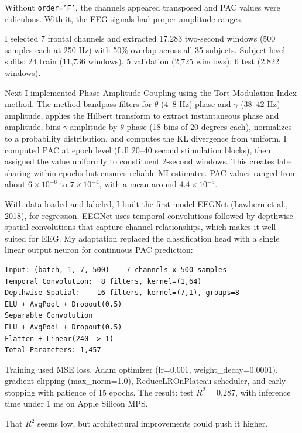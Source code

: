 \documentclass[11pt,letterpaper]{article}
\begin{document}
Without \texttt{order='F'}, the channels appeared transposed and PAC values were ridiculous.
With it, the EEG signals had proper amplitude ranges.

I selected 7 frontal channels and extracted 17,283 two-second windows (500 samples each at
250 Hz) with 50\% overlap across all 35 subjects. Subject-level splits: 24 train (11,736
windows), 5 validation (2,725 windows), 6 test (2,822 windows).

Next I implemented Phase-Amplitude Coupling using the Tort Modulation Index method. The method
bandpass filters for $\theta$ (4--8 Hz) phase and $\gamma$ (38--42 Hz) amplitude, applies the
Hilbert transform to extract instantaneous phase and amplitude, bins $\gamma$ amplitude by
$\theta$ phase (18 bins of 20 degrees each), normalizes to a probability distribution, and
computes the KL divergence from uniform. I computed PAC at epoch level (full 20--40 second
stimulation blocks), then assigned the value uniformly to constituent 2-second windows. This
creates label sharing within epochs but ensures reliable MI estimates. PAC values ranged from
about $6 \times 10^{-6}$ to $7 \times 10^{-4}$, with a mean around $4.4 \times 10^{-5}$.

With data loaded and labeled, I built the first model EEGNet (Lawhern et al., 2018), for
regression. EEGNet uses temporal convolutions followed by depthwise spatial convolutions that
capture channel relationships, which makes it well-suited for EEG. My adaptation replaced the
classification head with a single linear output neuron for continuous PAC prediction:

\begin{verbatim}
Input: (batch, 1, 7, 500) -- 7 channels x 500 samples
Temporal Convolution:  8 filters, kernel=(1,64)
Depthwise Spatial:    16 filters, kernel=(7,1), groups=8
ELU + AvgPool + Dropout(0.5)
Separable Convolution
ELU + AvgPool + Dropout(0.5)
Flatten + Linear(240 -> 1)
Total Parameters: 1,457
\end{verbatim}

Training used MSE loss, Adam optimizer (lr=0.001, weight\_decay=0.0001), gradient clipping
(max\_norm=1.0), ReduceLROnPlateau scheduler, and early stopping with patience of 15 epochs.
The result: test $R^2 = 0.287$, with inference time under 1 ms on Apple Silicon MPS.

That $R^2$ seems low, but architectural improvements could push it higher.

\end{document}
